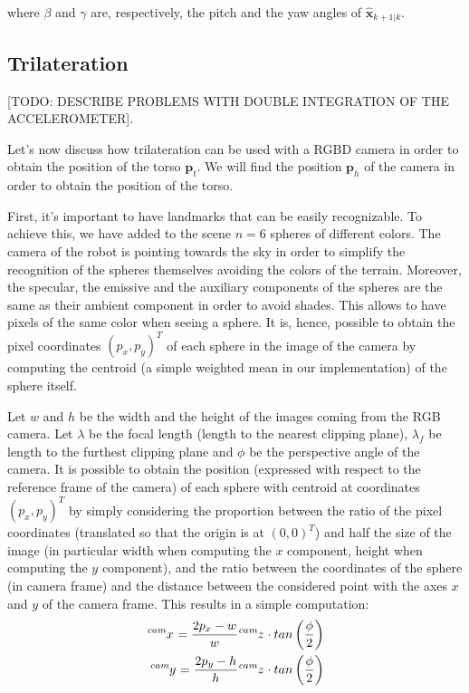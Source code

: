 \documentclass[a4paper]{article}
\begin{document}
\noindent where $\beta$ and $\gamma$ are, respectively,
the pitch and the yaw angles of $\bm{\hat{x}}_{k+1|k}$.

\subsection{Trilateration}

[TODO: DESCRIBE PROBLEMS WITH DOUBLE INTEGRATION OF THE
ACCELEROMETER].

\label{subsec:trilateration}
Let's now discuss how
trilateration\cite{trilateration-hereman-1995} can be used with
a RGBD camera in order to obtain the position of the torso
$\bm{p}_t$. We will find the position $\bm{p}_h$ of the camera
in order to obtain the position of the torso.

First, it's important to have landmarks that can be
easily recognizable. To achieve this, we have added to the scene
$n=6$ spheres of different colors. The camera of the robot is
pointing towards the
sky in order to simplify the recognition of the spheres
themselves avoiding the colors of the terrain.
Moreover, the specular, the emissive and the auxiliary
components of the spheres are the same as their ambient component
in order to avoid shades. This allows to have pixels of the same
color when seeing a sphere. It is, hence, possible to obtain
the pixel coordinates $(p_x, p_y)^T$ of each sphere in the image
of the camera by computing the centroid (a simple weighted mean
in our implementation) of the sphere itself.

Let $w$ and $h$ be the width and the
height of the images coming from the RGB camera. Let $\lambda$ be
the focal length (length to the nearest clipping
plane), $\lambda_f$ be length to the furthest clipping plane and
$\phi$ be the perspective angle of the camera. It is possible
to obtain the position (expressed with respect to
the reference frame of the camera) of each sphere with centroid
at coordinates $(p_x, p_y)^T$ by simply considering the proportion
between the ratio of the pixel coordinates (translated so
that the origin is at $(0, 0)^T$) and half the size of the
image (in particular width when computing the $x$ component,
height when computing the $y$ component), and the ratio between
the coordinates of the sphere (in camera frame) and the distance
between the considered point with the axes $x$ and $y$ of the
camera frame. This results in a simple computation:
\begin{align}
    \tensor[^{cam}]{x}{} = \frac{2 p_x - w}{w} \tensor[^{cam}]{z}{} \cdot tan\left(\frac{\phi}{2}\right) \\
    \tensor[^{cam}]{y}{} = \frac{2 p_y - h}{h} \tensor[^{cam}]{z}{} \cdot tan\left(\frac{\phi}{2}\right) 
\end{align}
\end{document}
